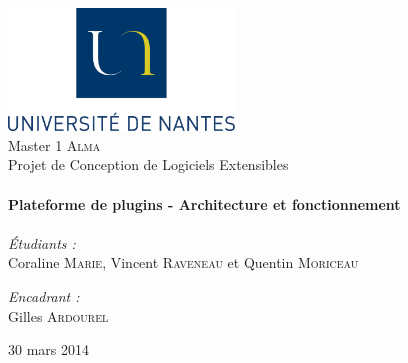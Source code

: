 
\begin{titlepage}
\begin{center}

\includegraphics[width=0.45\textwidth]{../figures/logoUN.png}~\\[2cm]

\LARGE{Master 1 \textsc{Alma}}\\[1.5cm]

\Large{Projet de Conception de Logiciels Extensibles}\\[0.5cm]

\HRule \\[0.4cm]
{ \huge \bfseries Plateforme de plugins - Architecture et fonctionnement \\[0.4cm] }
\HRule \\[1.5cm]

\normalsize	
\emph{\'Etudiants :}\\
Coraline \textsc{Marie}, Vincent \textsc{Raveneau} et Quentin \textsc{Moriceau}

\vspace{0.5cm}

\emph{Encadrant :} \\
Gilles \textsc{Ardourel}

\vfill

{\large 30 mars 2014}

\end{center}
\end{titlepage}
